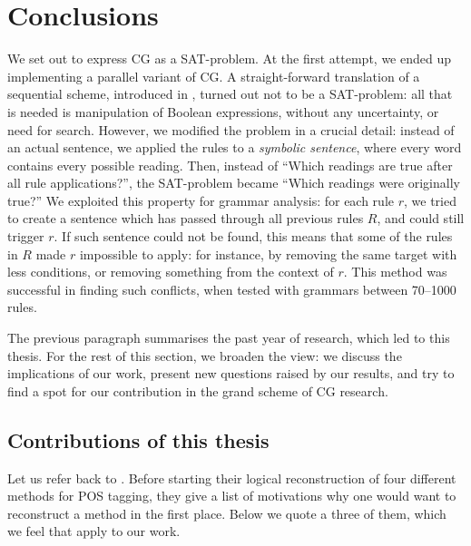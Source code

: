 \chapter{Conclusions}
\label{chapterConclusions}

We set out to express CG as a SAT-problem. 
At the first attempt, we ended up implementing a parallel variant of CG.
A straight-forward translation of a sequential scheme, introduced in \cite{lager_nivre01}, 
turned out not to be a SAT-problem: all that is needed is manipulation of Boolean expressions, 
without any uncertainty, or need for search. 
However, we modified the problem in a crucial detail: instead of an actual sentence, 
we applied the rules to a {\em symbolic sentence}, where every word contains every possible reading.
Then, instead of ``Which readings are true after all rule applications?'', the SAT-problem became ``Which readings were originally true?''
We exploited this property for grammar analysis: for each rule $r$, we tried to create a sentence 
which has passed through all previous rules $R$, and could still trigger $r$.
If such sentence could not be found, this means that some of the rules in $R$ made $r$ impossible to apply: for instance, by removing the same target with less conditions, or removing something from the context of $r$.
This method was successful in finding such conflicts, when tested with grammars between 70--1000 rules.

The previous paragraph summarises the past year of research, which led to this thesis. 
For the rest of this section, we broaden the view: we discuss the implications of our work, 
present new questions raised by our results, and try to find a spot for our contribution 
in the grand scheme of CG research.


\section{Contributions of this thesis}

Let us refer back to \cite{lager_nivre01}. 
Before starting their logical reconstruction of four different methods for POS tagging,
they give a list of motivations why one would want to reconstruct a method in the first place.
Below we quote a three of them, which we feel that apply to our work.

